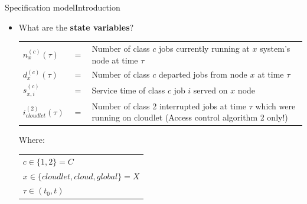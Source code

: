 \documentclass[10pt]{beamer}
\begin{document}
\begin{frame}{Specification model}{Introduction}


\begin{itemize}
\item What are the \textbf{state variables}?

\begin{table}[h!]
    \centering
    \small
    \begin{tabular}{p{1cm}p{0.5cm}p{8cm}}
       
      $n_x^{(c)}(\tau)$ & $ = $ & Number of class $c$ jobs currently running at $x$ system's node at time $\tau$ \\
      $d_x^{(c)}(\tau)$ & $ = $ & Number of class $c$ departed jobs from node $x$ at time $\tau$ \\
      $s_{x,i}^{(c)}$ & $ = $ & Service time of class $c$ job $i$ served on $x$ node   \\
      $i_{cloudlet}^{(2)}(\tau)$ & $ = $ & Number of class 2 interrupted jobs at time $\tau$ which were running on cloudlet (Access control algorithm 2 only!)\\
          
    \end{tabular}
\end{table}

Where:

\begin{table}[h!]
    \centering
    \small
    \begin{tabular}{l}
      $c \in \lbrace 1,2 \rbrace = C$ \\
      $x \in \lbrace cloudlet,cloud,global \rbrace = X$ \\
      $\tau \in (t_0, t)$ \\       
    \end{tabular}
\end{table}

\end{itemize}
\end{frame}
\end{document}
